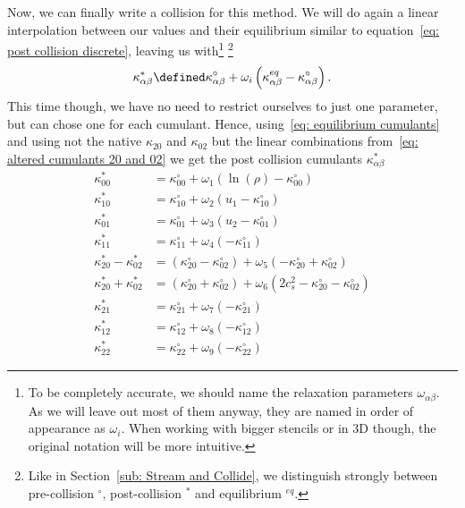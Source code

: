 
Now, we can finally write a collision for this method.
We will do again a linear interpolation between our values and their equilibrium similar to equation~\eqref{eq: post collision discrete}, leaving us with\footnote{To be completely accurate, we should name the relaxation parameters $\omega_{\alpha\beta}$.
As we will leave out most of them anyway, they are named in order of appearance as $\omega_{i}$.
When working with bigger stencils or in 3D though, the original notation will be more intuitive.}
\footnote{Like in Section~\eqref{sub: Stream and Collide}, we distinguish strongly between pre-collision $^\circ$, post-collision $^*$ and equilibrium $^{eq}$.}
\begin{equation*}
  \kappa_{\alpha\beta}^* \defined \kappa_{\alpha\beta}^{\circ} + \omega_i \left( \kappa_{\alpha\beta}^{eq} - \kappa_{\alpha\beta}^{\circ} \right).
\end{equation*}
This time though, we have no need to restrict ourselves to just one parameter, but can chose one for each cumulant.
Hence, using~\eqref{eq: equilibrium cumulants} and using not the native $\kappa_{20}$ and $\kappa_{02}$ but the linear combinations from~\eqref{eq: altered cumulants 20 and 02} we get the post collision cumulants $\kappa_{\alpha\beta}^*$
\begin{equation*}
  \begin{aligned}
    \kappa_{00}^{*} & = \kappa_{00}^{\circ}+ \omega_1 \left( \ln(\rho) - \kappa_{00}^{\circ}\right) \\
    \kappa_{10}^{*} & = \kappa_{10}^{\circ}+ \omega_2 \left( u_1 - \kappa_{10}^{\circ}\right) \\
    \kappa_{01}^{*} & = \kappa_{01}^{\circ}+ \omega_3 \left( u_2 - \kappa_{01}^{\circ}\right) \\
    \kappa_{11}^{*} & = \kappa_{11}^{\circ}+ \omega_4 \left( - \kappa_{11}^{\circ}\right) \\
    \kappa_{20}^{*} - \kappa_{02}^{*}
      & = (\kappa_{20}^{\circ}- \kappa_{02}^{\circ}) + \omega_5 \left( - \kappa_{20}^{\circ}+ \kappa_{02}^{\circ}\right) \\
    \kappa_{20}^{*} + \kappa_{02}^{*}
      & = (\kappa_{20}^{\circ}+ \kappa_{02}^{\circ}) + \omega_6 \left( 2 c_s^2 - \kappa_{20}^{\circ}- \kappa_{02}^{\circ}\right) \\
    \kappa_{21}^{*} & = \kappa_{21}^{\circ}+ \omega_7 \left( - \kappa_{21}^{\circ}\right) \\
    \kappa_{12}^{*} & = \kappa_{12}^{\circ}+ \omega_8 \left( - \kappa_{12}^{\circ}\right) \\
    \kappa_{22}^{*} & = \kappa_{22}^{\circ}+ \omega_9 \left( - \kappa_{22}^{\circ}\right)
  \end{aligned}
\end{equation*}

